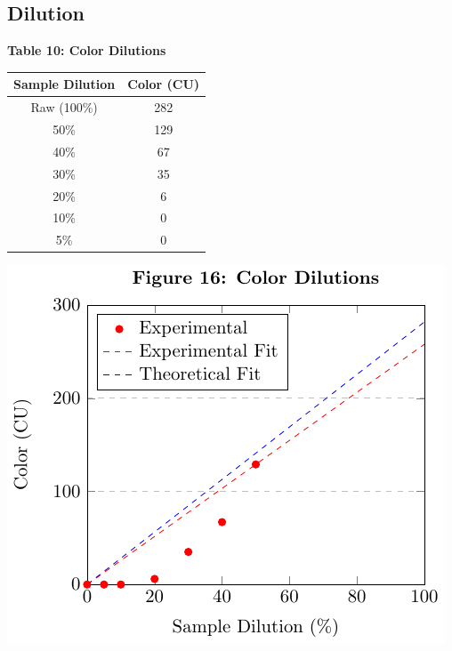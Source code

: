 \subsection{Dilution}
\begin{center}


\pgfplotsset{width=8cm}

\begin{minipage}{.5\textwidth}
\centering
{\large{\bf Table 10: Color Dilutions\\}}
\vspace{3 mm}
\begin{tabular}{|c c|}
    \hline
    \textbf{Sample Dilution} & \textbf{Color (CU)} \\\hline
    Raw (100\%)  & 282 \\
    50\% & 129 \\
    40\% & 67  \\
    30\% & 35  \\
    20\% & 6   \\
    10\% & 0   \\
    5\%  & 0   \\\hline
\end{tabular}
\end{minipage}%
\begin{minipage}{.5\textwidth}
    \centering
    \includegraphics*[page=1]{figs/fig16.pdf}
\end{minipage}
\vspace{20mm}


\end{center}
